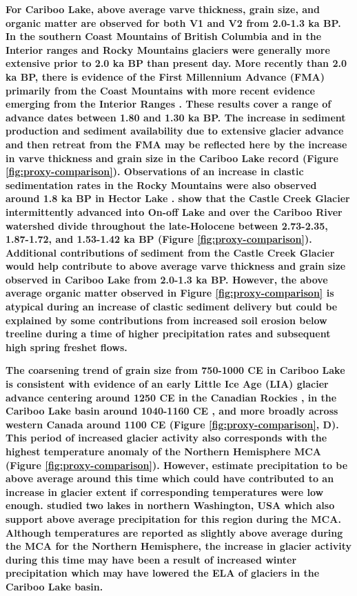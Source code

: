 \documentclass[Royal,times,doublespace,sageh]{sagej}
\begin{document}
\textbf{For Cariboo Lake, above average varve thickness, grain size, and
organic matter are observed for both V1 and V2 from 2.0-1.3 ka BP. In
the southern Coast Mountains of British Columbia
\citep{Koch2007a, Osborn2007, Allen2007, Clague2010} and in the Interior
ranges and Rocky Mountains \citep{Luckman1993, Luckman1995} glaciers
were generally more extensive prior to 2.0 ka BP than present day. More
recently than 2.0 ka BP, there is evidence of the First Millennium
Advance (FMA) primarily from the Coast Mountains
\citep{Reyes2006, Osborn2007} with more recent evidence emerging from
the Interior Ranges \citep{Maurer2012b}. These results cover a range of
advance dates between 1.80 and 1.30 ka BP. The increase in sediment
production and sediment availability due to extensive glacier advance
and then retreat from the FMA may be reflected here by the increase in
varve thickness and grain size in the Cariboo Lake record (Figure
\ref{fig:proxy-comparison}). Observations of an increase in clastic
sedimentation rates in the Rocky Mountains were also observed around 1.8
ka BP in Hector Lake \citep{Leonard1997}. \citet{Maurer2012b} show that
the Castle Creek Glacier intermittently advanced into On-off Lake and
over the Cariboo River watershed divide throughout the late-Holocene
between 2.73-2.35, 1.87-1.72, and 1.53-1.42 ka BP (Figure
\ref{fig:proxy-comparison}). Additional contributions of sediment from
the Castle Creek Glacier would help contribute to above average varve
thickness and grain size observed in Cariboo Lake from 2.0-1.3 ka BP.
However, the above average organic matter observed in Figure
\ref{fig:proxy-comparison} is atypical during an increase of clastic
sediment delivery but could be explained by some contributions from
increased soil erosion below treeline during a time of higher
precipitation rates and subsequent high spring freshet flows.}

\textbf{The coarsening trend of grain size from 750-1000 CE in Cariboo
Lake is consistent with evidence of an early Little Ice Age (LIA)
glacier advance centering around 1250 CE in the Canadian Rockies
\citep{Luckman1995, Osborn2001, Leonard1997}, in the Cariboo Lake basin
around 1040-1160 CE \citep{Maurer2012b}, and more broadly across western
Canada around 1100 CE \citep{Solomina2016} (Figure
\ref{fig:proxy-comparison}, D). This period of increased glacier
activity also corresponds with the highest temperature anomaly of the
Northern Hemisphere MCA \citep{Moberg2005} (Figure
\ref{fig:proxy-comparison}). However, \citet{Ljungqvist2016} estimate
precipitation to be above average around this time which could have
contributed to an increase in glacier extent if corresponding
temperatures were low enough. \citet{Steinman2012} studied two lakes in
northern Washington, USA which also support above average precipitation
for this region during the MCA. Although temperatures are reported as
slightly above average during the MCA \citep{Moberg2005} for the
Northern Hemisphere, the increase in glacier activity during this time
may have been a result of increased winter precipitation which may have
lowered the ELA of glaciers in the Cariboo Lake basin.}
\end{document}
